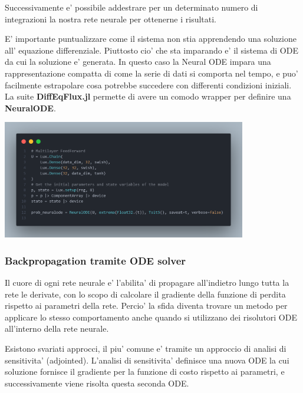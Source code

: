 Successivamente e' possibile addestrare per un determinato numero di integrazioni 
la nostra rete neurale per ottenerne i risultati. 

E' importante puntualizzare come il sistema non stia apprendendo una soluzione all'
equazione differenziale. Piuttosto cio' che sta imparando e' il sistema di ODE da cui 
la soluzione e' generata. In questo caso la Neural ODE impara una rappresentazione 
compatta di come la serie di dati si comporta nel tempo, e puo' facilmente estrapolare
cosa potrebbe succedere con differenti condizioni iniziali. La suite \textbf{DiffEqFlux.jl} \cite{chen2019neural} permette di avere un comodo wrapper 
per definire una \textbf{NeuralODE}.

\begin{minipage}{\linewidth}
    \centering
    \includegraphics[width=0.8\textwidth]{img/fneuralode.png}
    \label{fig:NeuralODE_Julia_example}
\end{minipage}

\subsubsection*{Backpropagation tramite ODE solver}
Il cuore di ogni rete neurale e' l'abilita' di propagare all'indietro \cite{wiki:Backpropagation} lungo tutta la 
rete le derivate, con lo scopo di calcolare il gradiente \cite{wiki:Gradiente_(funzione)} della funzione di perdita
rispetto ai parametri della rete. Percio' la sfida diventa trovare un metodo per
applicare lo stesso comportamento anche quando si utilizzano dei risolutori ODE 
all'interno della rete neurale.

Esistono svariati approcci, il piu' comune e' tramite un approccio di analisi di sensitivita' (adjointed).
L'analisi di sensitivita' definisce una nuova ODE la cui soluzione fornisce il gradiente per 
la funzione di costo rispetto ai parametri, e successivamente viene risolta questa seconda
ODE.

